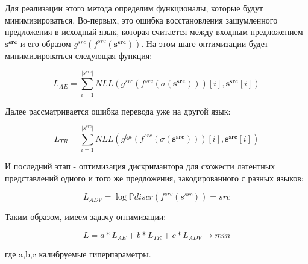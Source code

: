 \documentclass[12pt,twoside]{article}
\begin{document}
Для реализации этого метода определим функционалы, которые будут минимизироваться. Во-первых, это ошибка восстановления зашумленного предложения в исходный язык, которая считается между входным предложением $\mathbf{s^{src}}$ и его образом $g^{src}(f^{src}(\mathbf{s^{src}}))$. На этом шаге оптимизации будет минимизироваться следующая функция:

$$L_{AE} = \sum\limits_{i=1}^{|s^{src}|}NLL(g^{src}(f^{src}(\sigma(\mathbf{s^{src}})))[i],\mathbf{s^{src}}[i])$$

Далее рассматривается ошибка перевода уже на другой язык:

$$L_{TR} = \sum\limits_{i=1}^{|s^{src}|}NLL(g^{tgt}(f^{src}(\sigma(\mathbf{s^{src}})))[i],\mathbf{s^{src}}[i])$$

И последний этап - оптимизация дискримантора для схожести латентных представлений одного и того же предложения, закодированного с разных языков:

$$L_{ADV} = \log\mathbb{P}{discr(f^{src}(s^{src})) = src}$$

Таким образом, имеем задачу оптимизации:

$$L = a*L_{AE} + b*L_{TR}+c*L_{ADV} \longrightarrow min$$

где a,b,c калибруемые гиперпараметры.




\end{document}
